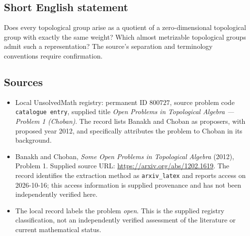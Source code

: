 \documentclass[11pt]{article}
\begin{document}
\subsection{Short English statement}
Does every topological group arise as a quotient of a zero-dimensional topological group with exactly the same weight? Which almost metrizable topological groups admit such a representation? The source's separation and terminology conventions require confirmation.
\subsection{Sources}
\begin{itemize}
\item Local UnsolvedMath registry: permanent ID \(800727\), source problem code \texttt{catalogue entry}, supplied title \emph{Open Problems in Topological Algebra --- Problem 1 (Choban)}. The record lists Banakh and Choban as proposers, with proposed year 2012, and specifically attributes the problem to Choban in its background.
\item Banakh and Choban, \emph{Some Open Problems in Topological Algebra} (2012), Problem 1. Supplied source URL: \url{https://arxiv.org/abs/1202.1619}. The record identifies the extraction method as \texttt{arxiv\_latex} and reports access on 2026-10-16; this access information is supplied provenance and has not been independently verified here.
\item The local record labels the problem \emph{open}. This is the supplied registry classification, not an independently verified assessment of the literature or current mathematical status.
\end{itemize}
\end{document}
